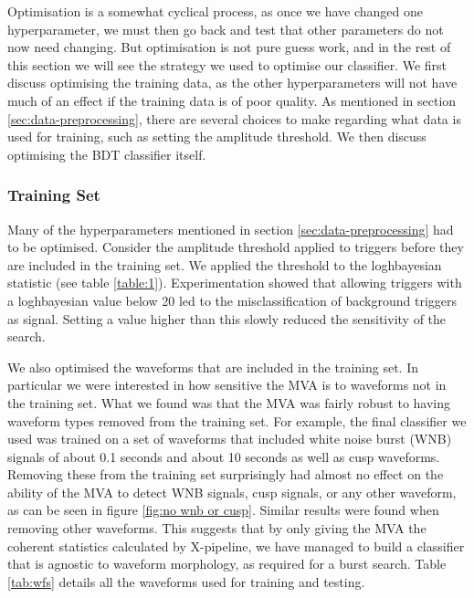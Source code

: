 \documentclass[11pt]{cuthesis}
\newcommand{\xpc}{X-pipeline, }
\begin{document}
Optimisation is a somewhat cyclical process, as once we have changed one hyperparameter, we must then go back and test that other parameters do not now need changing. But optimisation is not pure guess work, and in the rest of this section we will see the strategy we used to optimise our classifier. We first discuss optimising the training data, as the other hyperparameters will not have much of an effect if the training data is of poor quality. As mentioned in section \ref{sec:data-preprocessing}, there are several choices to make regarding what data is used for training, such as setting the amplitude threshold. We then discuss optimising the BDT classifier itself. 

\subsubsection{Training Set}
Many of the hyperparameters mentioned in section \ref{sec:data-preprocessing} had to be optimised. Consider the amplitude threshold applied to triggers before they are included in the training set. We applied the threshold to the loghbayesian statistic (see table \ref{table:1}). Experimentation showed that allowing triggers with a loghbayesian value below 20 led to the misclassification of background triggers as signal. Setting a value higher than this slowly reduced the sensitivity of the search.   

We also optimised the waveforms that are included in the training set. In particular we were interested in how sensitive the MVA is to waveforms not in the training set. What we found was that the MVA was fairly robust to having waveform types removed from the training set. For example, the final classifier we used was trained on a set of waveforms that included white noise burst (WNB) signals of about 0.1 seconds and about 10 seconds as well as cusp waveforms. Removing these from the training set surprisingly had almost no effect on the ability of the MVA to detect WNB signals, cusp signals, or any other waveform, as can be seen in figure \ref{fig:no wnb or cusp}. Similar results were found when removing other waveforms. This suggests that by only giving the MVA the coherent statistics calculated by \xpc we have managed to build a classifier that is agnostic to waveform morphology, as required for a burst search. Table \ref{tab:wfs} details all the waveforms used for training and testing.
\end{document}
